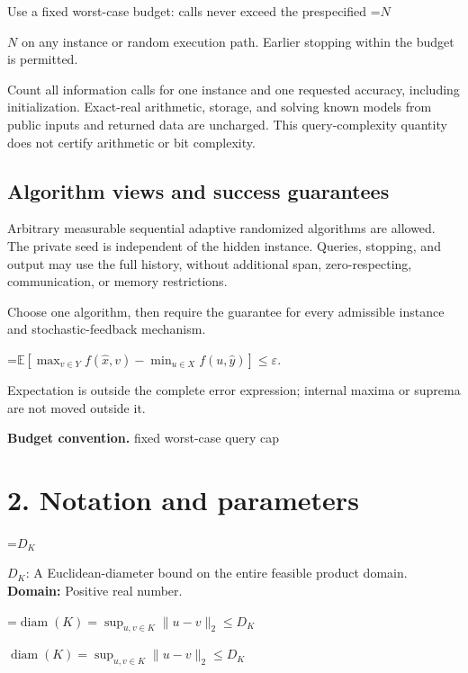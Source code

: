\documentclass[10pt,a4paper]{article}
\newcommand{\AtlasMath}[1]{\par\begingroup\centering\setbox0=\hbox{$\displaystyle #1$}\ifdim\wd0>1.4\linewidth\typeout{ATLAS WIDE FORMULA: \the\wd0}\fi\ifdim\wd0>\linewidth\resizebox{\linewidth}{!}{\box0}\else\box0\fi\par\endgroup}
\newcommand{\AtlasInlineMath}[1]{\begingroup\setbox0=\hbox{$#1$}\ifdim\wd0>.4\linewidth\endgroup\AtlasMath{#1}\else\endgroup$#1$\fi}
\begin{document}
Use a fixed worst-case budget: calls never exceed the prespecified \AtlasInlineMath{N} on any instance or random execution path. Earlier stopping within the budget is permitted.



Count all information calls for one instance and one requested accuracy, including initialization. Exact-real arithmetic, storage, and solving known models from public inputs and returned data are uncharged. This query-complexity quantity does not certify arithmetic or bit complexity.



\subsection{Algorithm views and success guarantees}


Arbitrary measurable sequential adaptive randomized algorithms are allowed. The private seed is independent of the hidden instance. Queries, stopping, and output may use the full history, without additional span, zero-respecting, communication, or memory restrictions.



Choose one algorithm, then require the guarantee for every admissible instance and stochastic-feedback mechanism.




\AtlasMath{\mathbb{E}\!\left[\max_{v\in Y}f(\widehat{x},v)-\min_{u\in X}f(u,\widehat{y})\right]\le\varepsilon.}




Expectation is outside the complete error expression; internal maxima or suprema are not moved outside it.



\textbf{Budget convention.} fixed worst-case query cap



\section{2. Notation and parameters}


\AtlasInlineMath{D_K}: A Euclidean-diameter bound on the entire feasible product domain. \textbf{Domain:} Positive real number.



\AtlasInlineMath{\operatorname{diam}(K)=\sup_{u,v\in K}\|u-v\|_2\le D_K}
\end{document}
